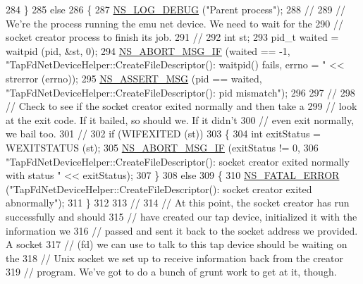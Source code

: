 \begin{DoxyCode}
284       \}
285   \textcolor{keywordflow}{else}
286     \{
287       \hyperlink{group__logging_ga413f1886406d49f59a6a0a89b77b4d0a}{NS\_LOG\_DEBUG} (\textcolor{stringliteral}{"Parent process"});
288       \textcolor{comment}{//}
289       \textcolor{comment}{// We're the process running the emu net device.  We need to wait for the}
290       \textcolor{comment}{// socket creator process to finish its job.}
291       \textcolor{comment}{//}
292       \textcolor{keywordtype}{int} st;
293       pid\_t waited = waitpid (pid, &st, 0);
294       \hyperlink{group__fatal_ga6653324225bc139e46deea177614ceee}{NS\_ABORT\_MSG\_IF} (waited == -1, \textcolor{stringliteral}{"TapFdNetDeviceHelper::CreateFileDescriptor():
       waitpid() fails, errno = "} << strerror (errno));
295       \hyperlink{assert_8h_aff5ece9066c74e681e74999856f08539}{NS\_ASSERT\_MSG} (pid == waited, \textcolor{stringliteral}{"TapFdNetDeviceHelper::CreateFileDescriptor(): pid
       mismatch"});
296 
297       \textcolor{comment}{//}
298       \textcolor{comment}{// Check to see if the socket creator exited normally and then take a}
299       \textcolor{comment}{// look at the exit code.  If it bailed, so should we.  If it didn't}
300       \textcolor{comment}{// even exit normally, we bail too.}
301       \textcolor{comment}{//}
302       \textcolor{keywordflow}{if} (WIFEXITED (st))
303         \{
304           \textcolor{keywordtype}{int} exitStatus = WEXITSTATUS (st);
305           \hyperlink{group__fatal_ga6653324225bc139e46deea177614ceee}{NS\_ABORT\_MSG\_IF} (exitStatus != 0,
306                            \textcolor{stringliteral}{"TapFdNetDeviceHelper::CreateFileDescriptor(): socket creator exited normally
       with status "} << exitStatus);
307         \}
308       \textcolor{keywordflow}{else}
309         \{
310           \hyperlink{group__fatal_ga5131d5e3f75d7d4cbfd706ac456fdc85}{NS\_FATAL\_ERROR} (\textcolor{stringliteral}{"TapFdNetDeviceHelper::CreateFileDescriptor(): socket creator
       exited abnormally"});
311         \}
312 
313       \textcolor{comment}{//}
314       \textcolor{comment}{// At this point, the socket creator has run successfully and should}
315       \textcolor{comment}{// have created our tap device, initialized it with the information we}
316       \textcolor{comment}{// passed and sent it back to the socket address we provided.  A socket}
317       \textcolor{comment}{// (fd) we can use to talk to this tap device should be waiting on the}
318       \textcolor{comment}{// Unix socket we set up to receive information back from the creator}
319       \textcolor{comment}{// program.  We've got to do a bunch of grunt work to get at it, though.}

\end{DoxyCode}

